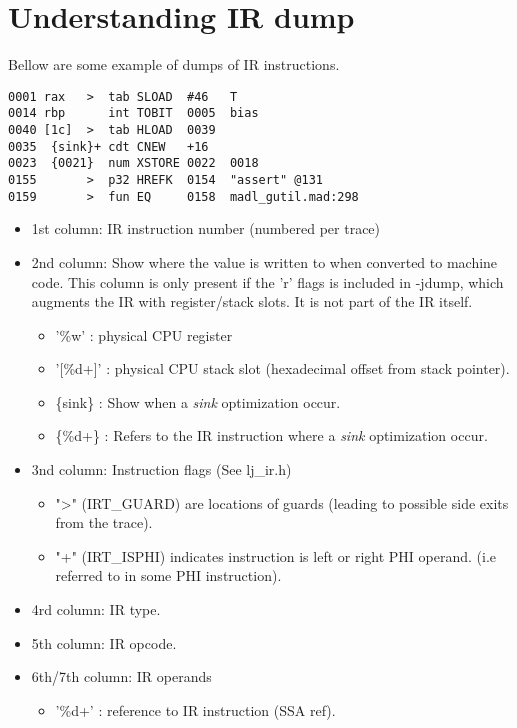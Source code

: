 \section{Understanding IR dump}
Bellow are some example of dumps of IR instructions.
\label{Sec:dump-ir}
\begin{verbatim}
0001 rax   >  tab SLOAD  #46   T
0014 rbp      int TOBIT  0005  bias
0040 [1c]  >  tab HLOAD  0039
0035  {sink}+ cdt CNEW   +16
0023  {0021}  num XSTORE 0022  0018
0155       >  p32 HREFK  0154  "assert" @131
0159       >  fun EQ     0158  madl_gutil.mad:298
\end{verbatim}

\begin{itemize}
  \item 1st column: IR instruction number (numbered per trace)
  \item 2nd column: Show where the value is written to when converted to machine
    code. This column is only present if the 'r' flags is included in -jdump,
    which augments the IR with register/stack slots. It is not part of the IR
    itself.
    \begin{itemize}
      \item '\%w' : physical CPU register
      \item '[\%d+]' : physical CPU stack slot (hexadecimal offset from stack pointer).
      \item \{sink\} : Show when a \emph{sink} optimization occur.
      \item \{\%d+\} : Refers to the IR instruction where a \emph{sink}
        optimization occur.
    \end{itemize}
  \item 3nd column: Instruction flags (See lj\_ir.h)
  \begin{itemize}
    \item "\textgreater" (IRT\_GUARD) are locations of
        guards (leading to possible side exits from the trace).
    \item "+" (IRT\_ISPHI) indicates
        instruction is left or right PHI operand. (i.e referred
        to in some PHI instruction).
  \end{itemize}
  \item 4rd column: IR type.
  \item 5th column: IR opcode.
  \item 6th/7th column: IR operands
    \begin{itemize}
      \item '\%d+' : reference to IR instruction (SSA ref).

\end{itemize}
\end{itemize}
